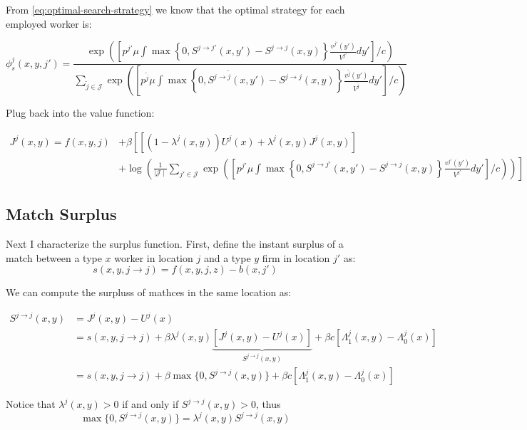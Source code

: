\documentclass[
  letterpaper,
  DIV=11,
  numbers=noendperiod]{scrreprt}
\begin{document}
From \eqref{eq:optimal-search-strategy} we know that the optimal
strategy for each employed worker is:

\[\phi_{s}^{j}(x,y,j')=\frac{\exp{\left(\left[p^{j'} \mu \int \max\left\{0, S^{j\to j'}(x,y') - S^{j \to j}(x,y) \right\}\frac{v^{j'}(y')}{V^{j'}}dy' \right] / c\right)}}{\sum_{\tilde{j}\in \mathcal{J}}\exp{\left(\left[p^{\tilde{j}} \mu \int \max\left\{0, S^{j\to \tilde{j} }(x,y')-S^{j \to j}(x,y) \right\}\frac{v^{ \tilde{j} }(y')}{V^{\tilde{j}}}dy' \right] / c\right)}}\]

Plug back into the value function:

\begin{align*} \label{eq-bellman-match}
J^j(x,y) = f(x,y,j) & + \beta\left [ \left[  (1-\lambda^j(x,y))U^{j}(x)   +\lambda^j(x,y)J^j(x,y) \right] \right. \\ & \left. +\log\left(\frac{1}{\mid \mathcal{J} \mid }\sum_{j'\in \mathcal{J}}\exp{\left(\left[p^{j'} \mu \int \max\left\{0, S^{j\to j' }(x,y')-S^{j \to j}(x,y) \right\}\frac{v^{ j' }(y')}{V^{j'}}dy' \right] / c\right)} \right) \right]
\end{align*}

\hypertarget{match-surplus}{%
\subsection{Match Surplus}\label{match-surplus}}

Next I characterize the surplus function. First, define the instant
surplus of a match between a type \(x\) worker in location \(j\) and a
type \(y\) firm in location \(j'\) as:
\[s(x,y,j \to j) = f(x,y,j,z) - b(x,j')\]

We can compute the surpluss of mathces in the same location as:

\begin{align}\label{eq-surplus-same-location}
S^{j \to j}(x,y) &= J^j(x, y) - U^{j}(x) \\
& = s(x,y,j \to j) + \beta \lambda^j(x,y)\underbrace{\left[J^j(x,y) - U^j(x)\right]}_{S^{j\to j}(x,y)} + \beta c \left[ \Lambda^j_1(x, y) - \Lambda^j_0(x)\right]\\
& = s(x,y,j \to j) + \beta \max\{0, S^{j\to j}(x,y)\} + \beta c \left[ \Lambda^j_1(x, y) - \Lambda^j_0(x)\right]
\end{align}

Notice that \(\lambda^{j}(x,y) > 0\) if and only if
\(S^{j\to j}(x,y) > 0\), thus
\[\max\{0, S^{j\to j}(x,y)\} =\lambda^{j}(x,y) S^{j\to j}(x,y) \]
\end{document}
